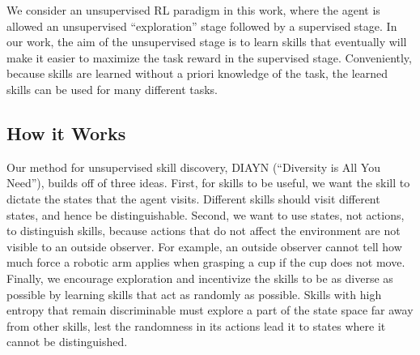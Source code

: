 \documentclass{article} %
\theoremstyle{questionstyle}\newtheorem{question}{Question}
\begin{document}
We consider an unsupervised RL paradigm in this work, where the agent is allowed an unsupervised ``exploration'' stage followed by a supervised stage.
In our work, the aim of the unsupervised stage is to learn skills that eventually will make it easier to maximize the task reward in the supervised stage. Conveniently, because skills are learned without a priori knowledge of the task, the learned skills can be used for many different tasks.



\subsection{How it Works}

Our method for unsupervised skill discovery, DIAYN (``Diversity is All You Need''),
builds off of three ideas.
First, for skills to be useful, we want the skill to dictate the states that the agent visits. Different skills should visit different states, and hence be distinguishable.
Second, we want to use states, not actions, to distinguish skills, because actions that do not affect the environment are not visible to an outside observer. For example, an outside observer cannot tell how much force a robotic arm applies when grasping a cup if the cup does not move.
Finally, we encourage exploration and incentivize the skills to be as diverse as possible by learning skills that act as randomly as possible. Skills with high entropy that remain discriminable must explore a part of the state space far away from other skills, lest the randomness in its actions lead it to states where it cannot be distinguished.
\end{document}
